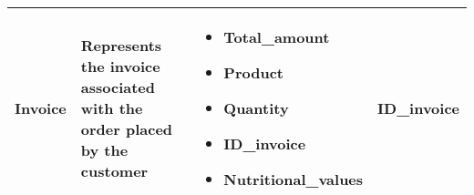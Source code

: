 \begin{longtable}{|p{}|p{} |p{}|p{} |}
    Invoice & Represents the invoice associated with the order placed by the customer &
        \begin{itemize}
            \vspace{-1em}
            \item Total\_amount
            \item Product
            \item Quantity
            \item ID\_invoice
            \item Nutritional\_values
        \end{itemize}
        &  ID\_invoice \\\hline
\end{longtable}